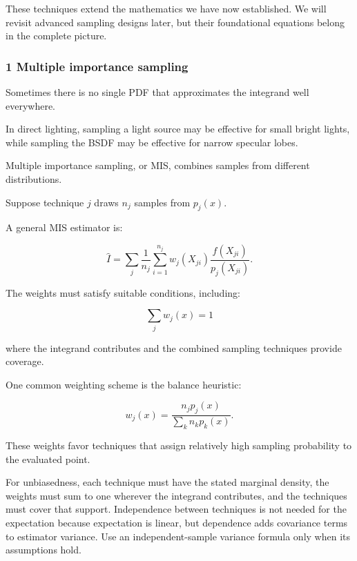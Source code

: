 \hypertarget{02-foundations-ii-ch031-related-techniques-multiple-importance-sampling-russian-roulette-and-control-variates}{}

These techniques extend the mathematics we have now established. We will revisit advanced sampling designs later, but their foundational equations belong in the complete picture.

\subsubsection{1 Multiple importance sampling}\label{02-foundations-ii-ch031-multiple-importance-sampling}

\hypertarget{02-foundations-ii-ch031-multiple-importance-sampling}{}

Sometimes there is no single PDF that approximates the integrand well everywhere.

In direct lighting, sampling a light source may be effective for small bright lights, while sampling the BSDF may be effective for narrow specular lobes.

Multiple importance sampling, or MIS, combines samples from different distributions.

Suppose technique \(j\) draws \(n_j\) samples from \(p_j(x)\).

A general MIS estimator is:

\[
 \boxed{ \widehat I= \sum_j\frac1{n_j} \sum_{i=1}^{n_j} w_j(X_{ji}) \frac{f(X_{ji})}{p_j(X_{ji})} }.
\]

The weights must satisfy suitable conditions, including:

\[
 \sum_jw_j(x)=1
\]

where the integrand contributes and the combined sampling techniques provide coverage.

One common weighting scheme is the balance heuristic:

\[
 \boxed{ w_j(x)= \frac{n_jp_j(x)} {\sum_kn_kp_k(x)} }.
\]

These weights favor techniques that assign relatively high sampling probability to the evaluated point.

For unbiasedness, each technique must have the stated marginal density, the weights must sum to one wherever the integrand contributes, and the techniques must cover that support. Independence between techniques is not needed for the expectation because expectation is linear, but dependence adds covariance terms to estimator variance. Use an independent-sample variance formula only when its assumptions hold.

